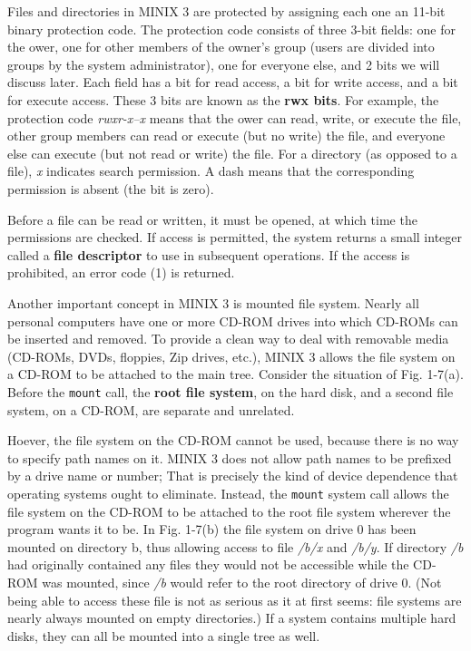 \documentclass{book}
\newcommand {\kw}  [1] {\textbf{#1}}
\newcommand {\sys} [1] {\textsl{#1}}
\newcommand {\cmd} [1] {\texttt{#1}}
\begin{document}
Files and directories in MINIX 3 are protected by assigning each one an 11-bit binary protection code.
The protection code consists of three 3-bit fields: one for the ower, one for other members of the owner's group 
(users are divided into groups by the system administrator), one for everyone else, and 2 bits we will discuss later.
Each field has a bit for read access, a bit for write access, and a bit for execute access.
These 3 bits are known as the \kw{rwx bits}.
For example, the protection code \sys{rwxr-x--x} means that the ower can read, write, or execute the file, 
other group members can read or execute (but no write) the file, and everyone else can execute (but not read or write) the file.
For a directory (as opposed to a file), \sys{x} indicates search permission.
A dash means that the corresponding permission is absent (the bit is zero).

Before a file can be read or written, it must be opened, at which time the permissions are checked.
If access is permitted, the system returns a small integer called a \kw{file descriptor} to use in subsequent operations.
If the access is prohibited, an error code (1) is returned.

Another important concept in MINIX 3 is mounted file system.
Nearly all personal computers have one or more CD-ROM drives into which CD-ROMs can be inserted and removed.
To provide a clean way to deal with removable media (CD-ROMs, DVDs, floppies, Zip drives, etc.), 
MINIX 3 allows the file system on a CD-ROM to be attached to the main tree.
Consider the situation of Fig. 1-7(a).
Before the \cmd{mount} call, the \kw{root file system}, on the hard disk, and a second file system, on a CD-ROM, are separate and unrelated.
 
Hoever, the file system on the CD-ROM cannot be used, because there is no way to specify path names on it.
MINIX 3 does not allow path names to be prefixed by a drive name or number;
That is precisely the kind of device dependence that operating systems ought to eliminate.
Instead, the \cmd{mount} system call allows the file system on the CD-ROM to be attached to the root file system wherever the program wants it to be.
In Fig. 1-7(b) the file system on drive 0 has been mounted on directory b, thus allowing access to file \sys{/b/x} and \sys{/b/y}.
If directory \sys{/b} had originally contained any files they would not be accessible while the CD-ROM was mounted, 
since \sys{/b} would refer to the root directory of drive 0.
(Not being able to access these file is not as serious as it at first seems: file systems are nearly always mounted on empty directories.)
If a system contains multiple hard disks, they can all be mounted into a single tree as well.
\end{document}

